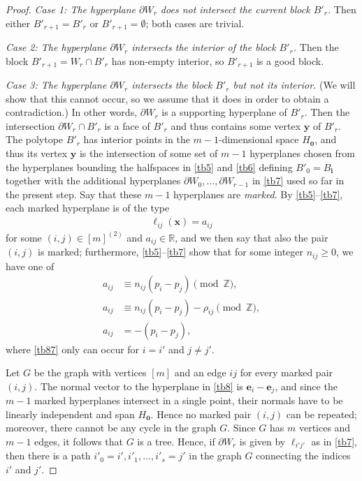 \documentclass[11pt,reqno,tbtags,a4paper]{amsart}
\numberwithin{equation}{section}
\renewcommand\ge{\geq}
\renewcommand\geq{\geqslant}
\theoremstyle{plain}%
\theoremstyle{definition}
\theoremstyle{remark}
\newcounter{cases}
\newcommand\pfcase[2]{\smallskip\noindent\emph{Case #1: #2} \noindent}
\newcommand\bbR{\mathbb R}
\newcommand\bbZ{\mathbb Z}
\newcounter{cc}
\newcommand\Ho{H_{\0}}
\newcommand\ve{\mathbf{e}}
\newcommand\vi{{\mathbf{i}}}
\newcommand\vx{\mathbf{x}}
\newcommand\vy{\mathbf{y}}
\newcommand\dW{\partial W}
\newcommand\mmx{[m]^{(2)}}
\newcommand\0{{\boldsymbol 0}}
\newcommand\1{{\boldsymbol 1}}
\begin{document}
\begin{proof}
\pfcase1{The hyperplane $\dW_r$ does not intersect the current block $B'_r$.}
Then either $B'_{r+1}=B'_r$ or $B'_{r+1}=\emptyset$;  both cases are
trivial. 

\pfcase2{The hyperplane $\dW_r$ intersects the interior of the block $B'_r$.}
Then the block $B'_{r+1}=W_r\cap B'_r$ has non-empty interior, 
so $B'_{r+1}$ is a good block.

\pfcase3{The hyperplane $\dW_r$ intersects the  block $B'_r$ but not its
interior.} 
(We will show that this cannot occur, so we assume that it does in order to
obtain a contradiction.)
In other words, $\dW_r$ is a supporting hyperplane of $B'_r$.
Then the intersection $\dW_r\cap B'_r$ is a face of $B'_r$ and thus contains
some vertex $\vy$ of $B'_r$.
%
The polytope $B'_r$ has interior points in the
$m-1$-dimensional space $\Ho$, and thus its vertex
$\vy$ is the intersection of some
set of $m-1$ hyperplanes
chosen from the hyperplanes bounding the halfspaces
in \eqref{tb5} and \eqref{tb6} defining $B'_0=B_\vi$ together with the
additional hyperplanes $\dW_0,\dots,\dW_{r-1}$ in \eqref{tb7}
used so far in the present step.
Say that these $m-1$ hyperplanes are \emph{marked}.
By \eqref{tb5}--\eqref{tb7},
each marked hyperplane is of the type 
\begin{align}\label{tb8}
\ell_{ij}(\vx)=a_{ij}  
\end{align}
for some 
$(i,j)\in\mmx$ and $a_{ij}\in\bbR$, 
and we then say that also the pair $(i,j)$ is marked;
furthermore, \eqref{tb5}--\eqref{tb7} show that
for some integer $n_{ij}\ge0$,  we have one of
\begin{align}\label{tb85}
a_{ij}&\equiv n_{ij}(p_i-p_j)\pmod\bbZ,
\\\label{tb86}
a_{ij}&\equiv n_{ij}(p_i-p_j)-\rho_{ij}\pmod\bbZ,
\\\label{tb87}
a_{ij}&= -(p_i-p_j),
\end{align}
where \eqref{tb87} only can occur for $i=i'$ and $j\neq j'$.

Let $G$ be the graph with vertices $[m]$ and an edge $ij$ for every marked pair
$(i,j)$.
The normal vector to the hyperplane in \eqref{tb8} 
is $\ve_i-\ve_j$, and since the
$m-1$ marked hyperplanes intersect in a single point, their normals have to
be linearly independent and span $\Ho$. Hence no marked pair $(i,j)$ can be
repeated; moreover, there cannot be any cycle in the graph $G$.
Since $G$ has $m$ vertices and $m-1$ edges, it follows that
$G$ is a tree. 
Hence, if $\dW_r$ is given by $\ell_{i'j'}$ as in
\eqref{tb7}, then there is a path $i'_0=i', i'_1, \dots, i'_s=j'$ in the graph
$G$ connecting the indices $i'$ and $j'$.


\end{proof}
\end{document}
